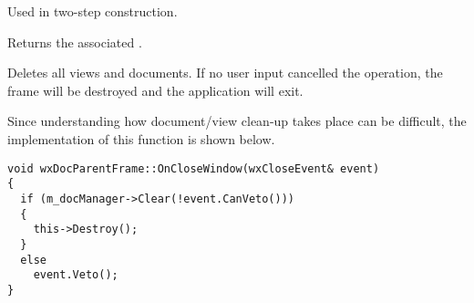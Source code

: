 
Used in two-step construction.

\label{wxdocparentframegetdocumentmanager}


Returns the associated .



\label{wxdocparentframeonclosewindow}


Deletes all views and documents. If no user input cancelled the
operation, the frame will be destroyed and the application will exit.

Since understanding how document/view clean-up takes place can be difficult,
the implementation of this function is shown below.

\begin{verbatim}
void wxDocParentFrame::OnCloseWindow(wxCloseEvent& event)
{
  if (m_docManager->Clear(!event.CanVeto()))
  {
    this->Destroy();
  }
  else
    event.Veto();
}
\end{verbatim}

